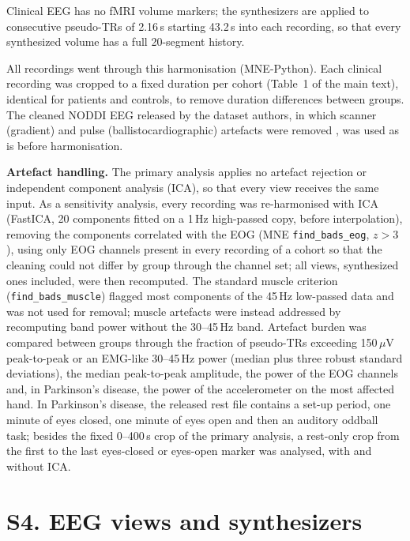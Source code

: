 \documentclass[10pt]{article}
\begin{document}
Clinical EEG has no fMRI volume markers; the synthesizers are applied to consecutive pseudo-TRs of 2.16\,s starting 43.2\,s into each recording, so that every synthesized volume has a full 20-segment history.

All recordings went through this harmonisation (MNE-Python). Each clinical recording was cropped to a fixed duration per cohort (Table~1 of the main text), identical for patients and controls, to remove duration differences between groups. The cleaned NODDI EEG released by the dataset authors, in which scanner (gradient) and pulse (ballistocardiographic) artefacts were removed \cite{dataset_01}, was used as is before harmonisation.

\noindent\textbf{Artefact handling.} The primary analysis applies no artefact rejection or independent component analysis (ICA), so that every view receives the same input. As a sensitivity analysis, every recording was re-harmonised with ICA (FastICA, 20 components fitted on a 1\,Hz high-passed copy, before interpolation), removing the components correlated with the EOG (MNE \texttt{find\_bads\_eog}, $z>3$), using only EOG channels present in every recording of a cohort so that the cleaning could not differ by group through the channel set; all views, synthesized ones included, were then recomputed. The standard muscle criterion (\texttt{find\_bads\_muscle}) flagged most components of the 45\,Hz low-passed data and was not used for removal; muscle artefacts were instead addressed by recomputing band power without the 30--45\,Hz band. Artefact burden was compared between groups through the fraction of pseudo-TRs exceeding 150\,$\mu$V peak-to-peak or an EMG-like 30--45\,Hz power (median plus three robust standard deviations), the median peak-to-peak amplitude, the power of the EOG channels and, in Parkinson's disease, the power of the accelerometer on the most affected hand. In Parkinson's disease, the released rest file contains a set-up period, one minute of eyes closed, one minute of eyes open and then an auditory oddball task; besides the fixed 0--400\,s crop of the primary analysis, a rest-only crop from the first to the last eyes-closed or eyes-open marker was analysed, with and without ICA.

\section*{S4. EEG views and synthesizers}
\end{document}
